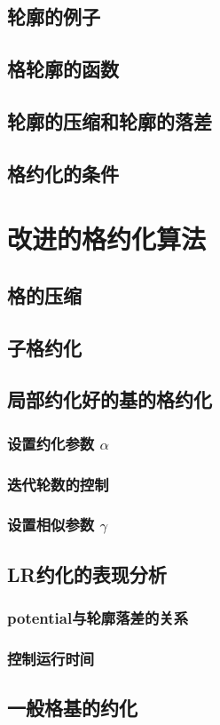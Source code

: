 \documentclass[UTF8]{ctexart}
\begin{document}
    \subsection{轮廓的例子}

    \subsection{格轮廓的函数}

    \subsection{轮廓的压缩和轮廓的落差}

    \subsection{格约化的条件}


\section{改进的格约化算法}

    \subsection{格的压缩}

    \subsection{子格约化}

    \subsection{局部约化好的基的格约化}

        \subsubsection{设置约化参数 $ \alpha $}

        \subsubsection{迭代轮数的控制}

        \subsubsection{设置相似参数 $\gamma$}

    \subsection{LR约化的表现分析}

        \subsubsection{potential与轮廓落差的关系}

        \subsubsection{控制运行时间}

    \subsection{一般格基的约化}
\end{document}
